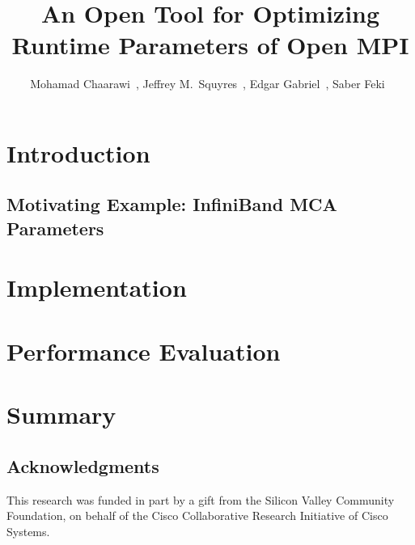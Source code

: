 \documentclass{llncs}
\begin{document}
\title{An Open Tool for Optimizing Runtime Parameters of Open MPI}

\author{
Mohamad Chaarawi~,
Jeffrey M.\ Squyres~,
Edgar Gabriel~,
Saber Feki~
}


\maketitle
\begin{abstract}

\end{abstract}

\section{Introduction}
\label{sec:intro}


\subsection{Motivating Example: InfiniBand MCA Parameters}
\label{sec:mot}


\section{Implementation}
\label{sec:impl}


\section{Performance Evaluation}
\label{sec:eval}


\section{Summary}
\label{sec:summary}


\subsection*{Acknowledgments}
This research was funded in part by a gift from the Silicon Valley Community Foundation, on behalf of the Cisco Collaborative Research Initiative of Cisco Systems.



\noindent
\end{document}
